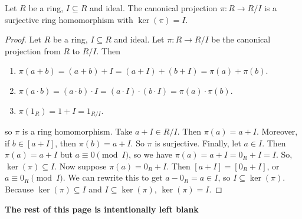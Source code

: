 \documentclass [12pt] {article}
\newenvironment{theorem}[1]{\begin{tcolorbox}[title={Theorem #1},colback=green!5!white,colframe=black!75!green]}{\end{tcolorbox}}
\renewcommand{\bf}[1]{\textbf{{#1}}}
\begin{document}
\newpage
\begin{theorem}{}
    Let $R$ be a ring, $I \subseteq R$ and ideal. The canonical projection $\pi : R \to R/I$ is a
    surjective ring homomorphism with $\ker(\pi) = I$.
\end{theorem}
\begin{proof}
    Let $R$ be a ring, $I \subseteq R$ and ideal. Let $\pi : R \to R/I$ be the canonical projection
    from $R$ to $R/I$. Then
    \begin{enumerate}[label=(\arabic*)]
        \item $\pi(a + b) = (a + b) + I = (a + I) + (b + I) = \pi(a) + \pi(b)$.
        \item $\pi(a \cdot b) = (a \cdot b) \cdot I = (a \cdot I) \cdot (b \cdot I) = \pi(a) \cdot \pi(b)$.
        \item $\pi(1_R) = 1 + I = 1_{R/I}$.
    \end{enumerate}
    so $\pi$ is a ring homomorphism. Take $a + I \in R/I$. Then $\pi(a) = a + I$. Moreover, if 
    $b \in [a + I]$, then $\pi(b) = a + I$. So $\pi$ is surjective. Finally, let $a \in I$. Then 
    $\pi(a) = a + I$ but $a \equiv 0 \pmod{I}$, so we have $\pi(a) = a + I = 0_R + I = I$. So, 
    $\ker(\pi) \subseteq I$. Now suppose $\pi(a) = 0_R + I$. Then $[a + I] = [0_R + I]$, 
    or $a \equiv 0_R \pmod{I}$. We can rewrite this to get $a - 0_R = a \in I$, so 
    $I \subseteq \ker(\pi)$. Because $\ker(\pi) \subseteq I$ and $I \subseteq \ker(\pi)$, 
    $\ker(\pi) = I$.
\end{proof}

\begin{center}
    \vspace{5em}
    \bf{The rest of this page is intentionally left blank}
\end{center}
\end{document}
